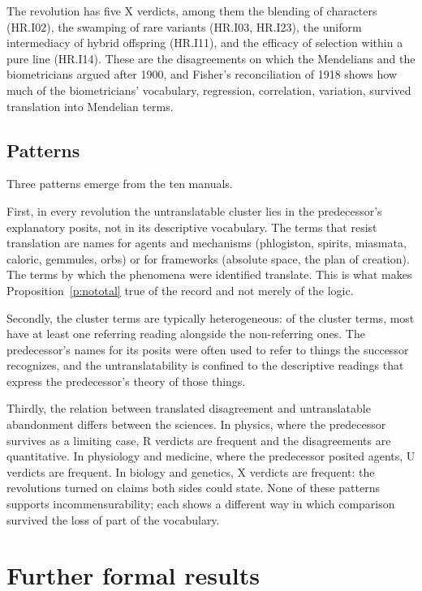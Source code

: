 \documentclass{situationist-preprint}
\begin{document}
The revolution has five X verdicts, among them the blending of characters (HR.I02), the swamping of rare variants (HR.I03, HR.I23), the uniform intermediacy of hybrid offspring (HR.I11), and the efficacy of selection within a pure line (HR.I14). These are the disagreements on which the Mendelians and the biometricians argued after 1900, and Fisher's reconciliation of 1918 shows how much of the biometricians' vocabulary, regression, correlation, variation, survived translation into Mendelian terms.

\subsection{Patterns}

Three patterns emerge from the ten manuals.

First, in every revolution the untranslatable cluster lies in the predecessor's explanatory posits, not in its descriptive vocabulary. The terms that resist translation are names for agents and mechanisms (phlogiston, spirits, miasmata, caloric, gemmules, orbs) or for frameworks (absolute space, the plan of creation). The terms by which the phenomena were identified translate. This is what makes Proposition~\ref{p:nototal} true of the record and not merely of the logic.

Secondly, the cluster terms are typically heterogeneous: of the \nclusterall{} cluster terms, most have at least one referring reading alongside the non-referring ones. The predecessor's names for its posits were often used to refer to things the successor recognizes, and the untranslatability is confined to the descriptive readings that express the predecessor's theory of those things.

Thirdly, the relation between translated disagreement and untranslatable abandonment differs between the sciences. In physics, where the predecessor survives as a limiting case, R verdicts are frequent and the disagreements are quantitative. In physiology and medicine, where the predecessor posited agents, U verdicts are frequent. In biology and genetics, X verdicts are frequent: the revolutions turned on claims both sides could state. None of these patterns supports incommensurability; each shows a different way in which comparison survived the loss of part of the vocabulary.

\section{Further formal results}\label{s:formal}
\end{document}
